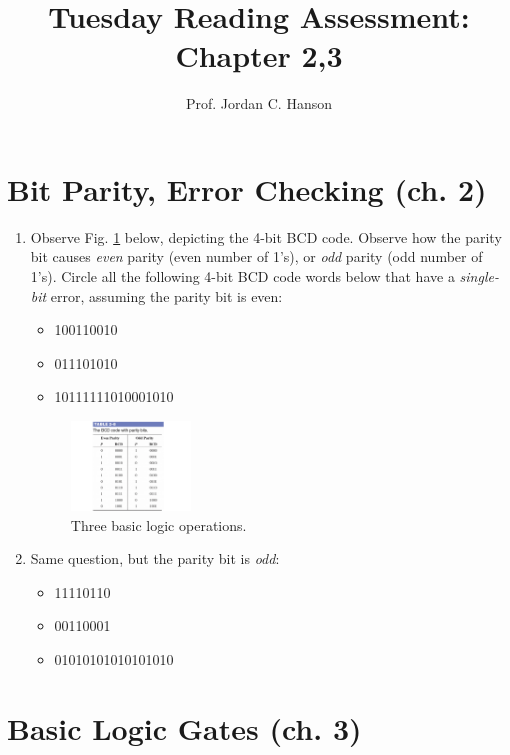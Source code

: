 \documentclass{article}
\begin{document}
\title{Tuesday Reading Assessment: Chapter 2,3}
\author{Prof. Jordan C. Hanson}

\maketitle

\section{Bit Parity, Error Checking (ch. 2)}

\begin{enumerate}
\item Observe Fig. \ref{fig:par} below, depicting the 4-bit BCD code.  Observe how the parity bit causes \textit{even} parity (even number of 1's), or \textit{odd} parity (odd number of 1's).  Circle all the following 4-bit BCD code words below that have a \textit{single-bit} error, assuming the parity bit is even:
\begin{itemize}
\item 100110010
\item 011101010
\item 10111111010001010
\end{itemize}
\begin{figure}[ht]
\centering
\includegraphics[width=0.3\textwidth]{parity.pdf}
\caption{\label{fig:par} Three basic logic operations.}
\end{figure}
\item Same question, but the parity bit is \textit{odd}:
\begin{itemize}
\item 11110110
\item 00110001
\item 01010101010101010
\end{itemize}
\end{enumerate}

\section{Basic Logic Gates (ch. 3)}
\end{document}
